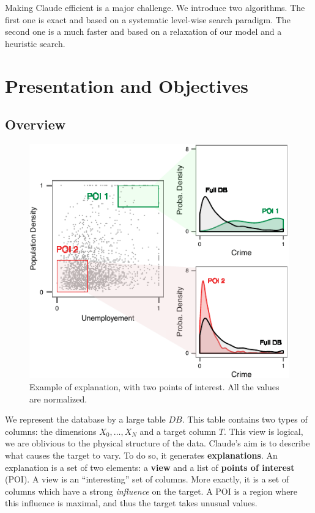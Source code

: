 Making Claude efficient is a major challenge. We
introduce two algorithms.  The first one is exact and based on a systematic
level-wise search paradigm.  The second one is a much faster and based on a
relaxation of our model and a heuristic search.

\section{Presentation and Objectives}

\subsection{Overview}
\begin{figure}[t!]
\centering
\includegraphics[width=\columnwidth]{images/Overview}
\caption{Example of explanation, with two points of interest. All the values
are normalized.}
\label{fig:overview}
\end{figure}
We represent the database by a large table $DB$. This table contains two types
of columns: the dimensions $X_0, \ldots, X_N$ and a target column $T$. This
view is logical, we are oblivious to the physical structure of the data.
Claude's aim is to describe what causes the target to vary. To do so, it
generates \textbf{explanations}.  An explanation is a set of two elements: a
\textbf{view} and a list of \textbf{points of interest} (POI). A view is an
``interesting'' set of columns.  More exactly, it is a set of columns which
have a strong \emph{influence} on the target. A POI is a region where this
influence is maximal, and thus the target takes unusual values.

